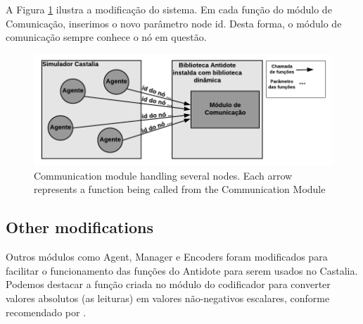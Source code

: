 A Figura \ref{fig:communicationModuleCastalia} ilustra a modificação do sistema. Em cada função do módulo de Comunicação, inserimos o novo parâmetro node id. Desta forma, o módulo de comunicação sempre conhece o nó em questão.


\begin{figure}[ht]
\centering
\includegraphics[width=.5\textwidth]{figures/communicationModule.png}
\caption{Communication module handling several nodes. Each arrow represents a function being called from the Communication Module}
\label{fig:communicationModuleCastalia} 
\end{figure}

\subsection{Other modifications}

Outros módulos como Agent, Manager e Encoders foram modificados para facilitar o funcionamento das funções do Antidote para serem usados no Castalia. Podemos destacar a função criada no módulo do codificador para converter valores absolutos (as leituras) em valores não-negativos escalares, conforme recomendado por \cite{b1}. 

